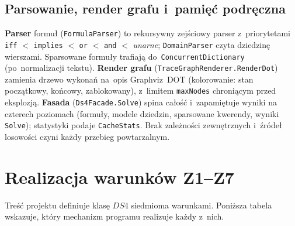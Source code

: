 \documentclass[11pt,a4paper]{article}
\begin{document}
\subsection{Parsowanie, render grafu i~pamięć podręczna}
\textbf{Parser} formuł (\texttt{FormulaParser}) to rekursywny zejściowy parser
z~priorytetami \texttt{iff} $<$ \texttt{implies} $<$ \texttt{or} $<$ \texttt{and}
$<$ \emph{unarne}; \texttt{DomainParser} czyta dziedzinę wierszami. Sparsowane
formuły trafiają do~\texttt{ConcurrentDictionary} (po~normalizacji tekstu).
\textbf{Render grafu} (\texttt{TraceGraphRenderer.RenderDot}) zamienia drzewo
wykonań na~opis Graphviz~DOT (kolorowanie: stan początkowy, końcowy,
zablokowany), z~limitem \texttt{maxNodes} chroniącym przed eksplozją.
\textbf{Fasada} (\texttt{Ds4Facade.Solve}) spina całość i~zapamiętuje wyniki na
czterech poziomach (formuły, modele dziedzin, sparsowane kwerendy, wyniki
\texttt{Solve}); statystyki podaje \texttt{CacheStats}. Brak zależności
zewnętrznych i~źródeł losowości czyni każdy przebieg powtarzalnym.

\section{Realizacja warunków Z1--Z7}

Treść projektu definiuje klasę $\mathit{DS4}$ siedmioma warunkami.
Poniższa tabela wskazuje, który mechanizm programu realizuje każdy z~nich.
\end{document}
